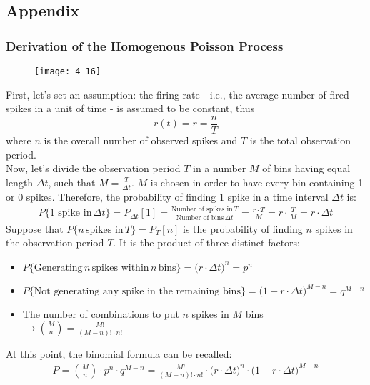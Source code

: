 \subsection{Appendix}
\subsubsection{Derivation of the Homogenous Poisson Process}
\begin{figure}[H]
    \texttt{[image: 4\_16]}
    \centering
\end{figure}
First, let's set an assumption: the firing rate - i.e., the average number
of fired spikes in a unit of time - is assumed to be constant, thus
\begin{equation*}
    r(t)=r=\frac{n}{T}
\end{equation*}
where \(n\) is the overall number of observed spikes
and \(T\) is the total observation period.\\
Now, let's divide the observation period \(T\) in a number \(M\) of bins having
equal length \(\Delta t\), such that \(M=\frac{T}{\Delta{t}}\). \(M\) is chosen in order to
have every bin containing 1 or 0 spikes. Therefore, the probability of finding 1 spike in a
time interval \(\Delta{t}\) is:
\begin{align*}
    P\{\text{1 spike in}\,\Delta{t}\}=P_{\Delta{t}}[1]
    =\frac{\text{Number of spikes in}\,T}{\text{Number of bins}\,\Delta{t}}
    =\frac{r\cdot{T}}{M}
    =r\cdot\frac{T}{M}
    =r\cdot{\Delta{t}}
\end{align*}
Suppose that \(P\{n\,\text{spikes in}\,T\}=P_T[n]\) is the probability of finding \(n\)
spikes in the observation period \(T\). It is the product of three distinct factors:
\begin{itemize}
    \item \(P\{\text{Generating}\,n\,\text{spikes within}\,n\,\text{bins}\}
          =\bigl(r\cdot{\Delta{t}}\bigr)^n=p^n\)
    \item \(P\{\text{Not generating any spike in the remaining bins}\}
          =\bigl(1-r\cdot{\Delta{t}}\bigr)^{M-n}=q^{M-n}\)
    \item The number of combinations to put \(n\) spikes in \(M\) bins
          \(\rightarrow\binom{M}{n}=\frac{M!}{(M-n)!\cdot{n!}}\)
\end{itemize}
At this point, the binomial formula can be recalled:
\begin{align*}
    P=\binom{M}{n}\cdot{p^n}\cdot{q^{M-n}}=\frac{M!}{(M-n)!\cdot{n!}}\cdot{\bigl(r\cdot{\Delta{t}}\bigr)^n}\cdot{\bigl(1-r\cdot{\Delta{t}}\bigr)^{M-n}}
\end{align*}
